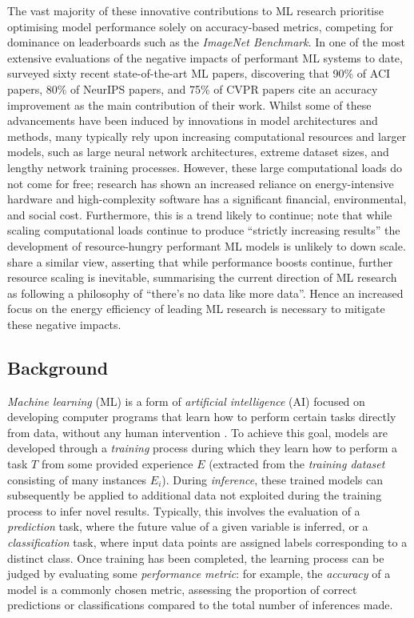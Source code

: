 \documentclass[a4paper, 12pt]{article}
\begin{document}
    The vast majority of these innovative contributions to ML research prioritise optimising model performance solely on accuracy-based metrics, competing for dominance on leaderboards such as the \emph{ImageNet Benchmark}. In one of the most extensive evaluations of the negative impacts of performant ML systems to date,  surveyed sixty recent state-of-the-art ML papers, discovering that 90\% of ACI papers, 80\% of NeurIPS papers, and 75\% of CVPR papers cite an accuracy improvement as the main contribution of their work. Whilst some of these advancements have been induced by innovations in model architectures and methods, many typically rely upon increasing computational resources and larger models, such as large neural network architectures, extreme dataset sizes, and lengthy network training processes. However, these large computational loads do not come for free; research has shown an increased reliance on energy-intensive hardware and high-complexity software has a significant financial, environmental, and social cost. Furthermore, this is a trend likely to continue;  note that while scaling computational loads continue to produce ``strictly increasing results” the development of resource-hungry performant ML models is unlikely to down scale.  share a similar view, asserting that while performance boosts continue, further resource scaling is inevitable, summarising the current direction of ML research as following a philosophy of ``there's no data like more data”. Hence an increased focus on the energy efficiency of leading ML research is necessary to mitigate these negative impacts.

    \subsection{Background}

    \emph{Machine learning} (ML) is a form of \emph{artificial intelligence} (AI) focused on developing computer programs that learn how to perform certain tasks directly from data, without any human intervention \cite{samuel-1959}. To achieve this goal, models are developed through a \emph{training} process during which they learn how to perform a task $T$ from some provided experience $E$ (extracted from the \emph{training dataset} consisting of many instances $E_i$). During \emph{inference}, these trained models can subsequently be applied to additional data not exploited during the training process to infer novel results. Typically, this involves the evaluation of a \emph{prediction} task, where the future value of a given variable is inferred, or a \emph{classification} task, where input data points are assigned labels corresponding to a distinct class. Once training has been completed, the learning process can be judged by evaluating some \emph{performance metric}: for example, the \emph{accuracy} of a model is a commonly chosen metric, assessing the proportion of correct predictions or classifications compared to the total number of inferences made. 
\end{document}
